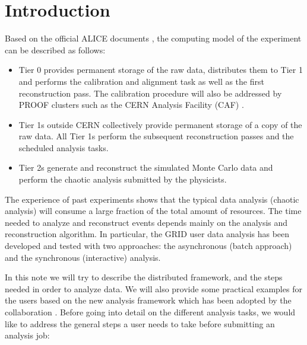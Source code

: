 \section{Introduction}
\label{Note:INTRO}

Based on the official ALICE documents
\cite{Note:RefPPR,Note:RefComputingTDR}, the computing model of the
experiment can be described as follows:

\begin{itemize}
\item Tier 0 provides permanent storage of the raw data, distributes
  them to Tier 1 and performs the calibration and alignment task as
  well as the first reconstruction pass. The calibration procedure
  will also be addressed by PROOF clusters such as the CERN Analysis
  Facility (CAF) \cite{Note:RefCAF}.

\item Tier 1s outside CERN collectively provide permanent storage of a
  copy of the raw data. All Tier 1s perform the subsequent
  reconstruction passes and the scheduled analysis tasks.

\item Tier 2s generate and reconstruct the simulated Monte Carlo data
  and perform the chaotic analysis submitted by the physicists.

\end{itemize}

The experience of past experiments shows that the typical data
analysis (chaotic analysis) will consume a large fraction of the total
amount of resources. The time needed to analyze and reconstruct events
depends mainly on the analysis and reconstruction algorithm. In
particular, the GRID user data analysis has been developed and tested
with two approaches: the asynchronous (batch approach) and the
synchronous (interactive) analysis.


In this note we will try to describe the distributed framework, and
the steps needed in order to analyze data. We will also provide some
practical examples for the users based on the new analysis framework
which has been adopted by the collaboration
\cite{Note:RefAnalysisFramework}. Before going into detail on the
different analysis tasks, we would like to address the general steps a
user needs to take before submitting an analysis job:


